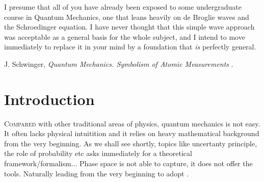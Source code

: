 


\label{chp:fundamentals} 


\begin{quoting}
   \openquote 
   I presume that all of you have already been exposed to some undergraduate
   course in Quantum Mechanics, one that leans heavily on de Broglie waves and
   the Schroedinger equation. I have never thought that this simple wave
   approach was acceptable as a general basis for the whole subject, and I
   intend to move immediately to replace it in your mind by a foundation that
   \emph{is} perfectly general.~\closequote
   \begin{flushright}
       J. Schwinger,
       \emph{Quantum Mechanics. Symbolism of Atomic Measurements}
       \textcite{Schwinger:2001}.
    \end{flushright}
\end{quoting}

\section{Introduction}

\lettrine{C}{ompared} 
with other traditional areas of physics, quantum mechanics is not easy. 
It often lacks physical intuitition and it relies on heavy mathematical
background from the very beginning.
As we shall see shortly, 
topics like uncertanty principle, the role of probability etc
asks immediately for a theoretical framework/formalism... Phase space is not
able to capture, it does not offer the tools. 
Naturally leading from the very beginning to adopt .
